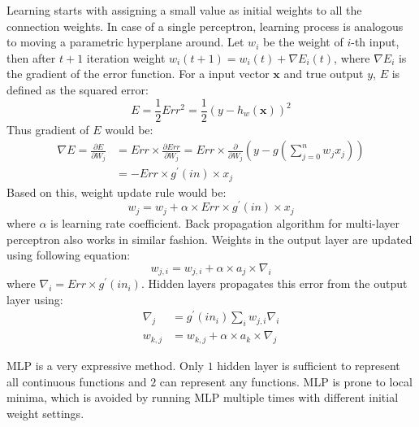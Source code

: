 Learning starts with assigning a small value as initial weights to all the connection weights. In case of a single perceptron, learning process is analogous to moving a parametric hyperplane around. Let $w_i$ be the weight of $i$-th input, then after $t+1$ iteration weight $w_i(t+1) = w_i(t) + \nabla E_i(t)$, where $\nabla E_i$ is the gradient of the error function. For a input vector $\mathbf{x}$ and true output $y$, $E$ is defined as the squared error:
\[
E = \frac{1}{2} Err^2 = \frac{1}{2} (y - h_w(\mathbf{x}))^2
\]
Thus gradient of $E$ would be:
\begin{align*}
\nabla E = \frac{\partial E}{\partial W_j} & = Err \times \frac{\partial Err}{\partial W_j} = Err \times \frac{\partial}{\partial W_j} (y - g(\sum_{j=0}^n w_j x_j)) \\
& = - Err \times g^{\prime} (in) \times x_j
\end{align*}
Based on this, weight update rule would be:
\[
w_j = w_j + \alpha \times Err \times g^{\prime} (in) \times x_j
\]
where $\alpha$ is learning rate coefficient. Back propagation algorithm for multi-layer perceptron also works in similar fashion. Weights in the output layer are updated using following equation:
\[
w_{j,i} = w_{j,i} + \alpha \times a_j \times \nabla_i
\]
where $\nabla_i = Err \times g^\prime(in_i)$. Hidden layers propagates this error from the output layer using:
\begin{align*}
\nabla_j &= g^\prime (in_i) \sum_i w_{j,i} \nabla_i \\
w_{k, j} &= w_{k, j} + \alpha \times a_k \times \nabla_j
\end{align*}

MLP is a very expressive method. Only $1$ hidden layer is sufficient to represent all continuous functions and $2$ can represent any functions. MLP is prone to local minima, which is avoided by running MLP multiple times with different initial weight settings.